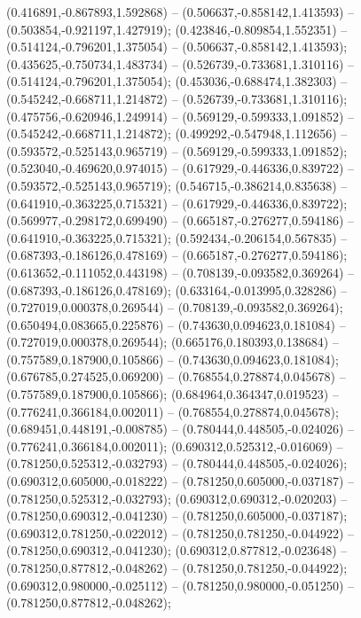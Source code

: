  (0.416891,-0.867893,1.592868) -- (0.506637,-0.858142,1.413593) -- (0.503854,-0.921197,1.427919);
 (0.423846,-0.809854,1.552351) -- (0.514124,-0.796201,1.375054) -- (0.506637,-0.858142,1.413593);
 (0.435625,-0.750734,1.483734) -- (0.526739,-0.733681,1.310116) -- (0.514124,-0.796201,1.375054);
 (0.453036,-0.688474,1.382303) -- (0.545242,-0.668711,1.214872) -- (0.526739,-0.733681,1.310116);
 (0.475756,-0.620946,1.249914) -- (0.569129,-0.599333,1.091852) -- (0.545242,-0.668711,1.214872);
 (0.499292,-0.547948,1.112656) -- (0.593572,-0.525143,0.965719) -- (0.569129,-0.599333,1.091852);
 (0.523040,-0.469620,0.974015) -- (0.617929,-0.446336,0.839722) -- (0.593572,-0.525143,0.965719);
 (0.546715,-0.386214,0.835638) -- (0.641910,-0.363225,0.715321) -- (0.617929,-0.446336,0.839722);
 (0.569977,-0.298172,0.699490) -- (0.665187,-0.276277,0.594186) -- (0.641910,-0.363225,0.715321);
 (0.592434,-0.206154,0.567835) -- (0.687393,-0.186126,0.478169) -- (0.665187,-0.276277,0.594186);
 (0.613652,-0.111052,0.443198) -- (0.708139,-0.093582,0.369264) -- (0.687393,-0.186126,0.478169);
 (0.633164,-0.013995,0.328286) -- (0.727019,0.000378,0.269544) -- (0.708139,-0.093582,0.369264);
 (0.650494,0.083665,0.225876) -- (0.743630,0.094623,0.181084) -- (0.727019,0.000378,0.269544);
 (0.665176,0.180393,0.138684) -- (0.757589,0.187900,0.105866) -- (0.743630,0.094623,0.181084);
 (0.676785,0.274525,0.069200) -- (0.768554,0.278874,0.045678) -- (0.757589,0.187900,0.105866);
 (0.684964,0.364347,0.019523) -- (0.776241,0.366184,0.002011) -- (0.768554,0.278874,0.045678);
 (0.689451,0.448191,-0.008785) -- (0.780444,0.448505,-0.024026) -- (0.776241,0.366184,0.002011);
 (0.690312,0.525312,-0.016069) -- (0.781250,0.525312,-0.032793) -- (0.780444,0.448505,-0.024026);
 (0.690312,0.605000,-0.018222) -- (0.781250,0.605000,-0.037187) -- (0.781250,0.525312,-0.032793);
 (0.690312,0.690312,-0.020203) -- (0.781250,0.690312,-0.041230) -- (0.781250,0.605000,-0.037187);
 (0.690312,0.781250,-0.022012) -- (0.781250,0.781250,-0.044922) -- (0.781250,0.690312,-0.041230);
 (0.690312,0.877812,-0.023648) -- (0.781250,0.877812,-0.048262) -- (0.781250,0.781250,-0.044922);
 (0.690312,0.980000,-0.025112) -- (0.781250,0.980000,-0.051250) -- (0.781250,0.877812,-0.048262);
